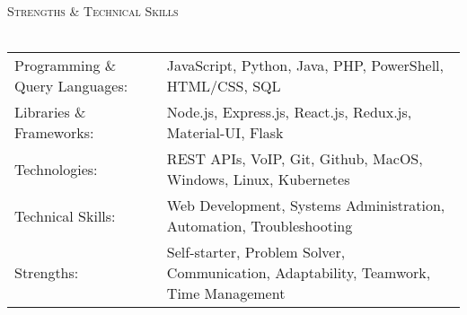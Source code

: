 \documentclass[letterpaper]{article}
\newcommand{\lineunder} {
    \vspace*{-8pt} \\
    \hspace*{-18pt} \hrulefill \\
}
\newcommand{\header} [1] {
    {\hspace*{-18pt}\vspace*{6pt} \textsc{#1}}
    \vspace*{-6pt} \lineunder
}
\begin{document}
\header{Strengths \& Technical Skills}
\begin{tabular}{ l l }
	Programming \& Query Languages: & JavaScript, Python, Java, PHP, PowerShell, HTML/CSS, SQL \\
    Libraries \& Frameworks:         & Node.js, Express.js, React.js, Redux.js, Material-UI, Flask \\
	Technologies:                   & REST APIs, VoIP, Git, Github, MacOS, Windows, Linux, Kubernetes \\
    Technical Skills:              & Web Development, Systems Administration, Automation, Troubleshooting \\
    Strengths:                      & Self-starter, Problem Solver, Communication, Adaptability, Teamwork, Time Management \\
\end{tabular}
\vspace{2mm}


\
\end{document}
